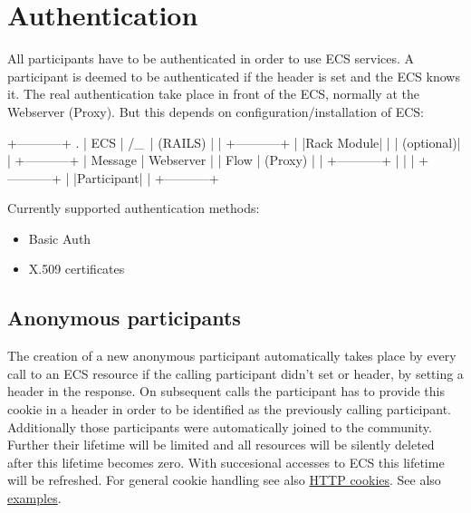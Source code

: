 \section{Authentication}%
%
All participants have to be authenticated in order to use ECS services. A
participant is deemed to be authenticated if the  header is set and
the ECS knows it. The real authentication take place in front of the ECS,
normally at the Webserver (Proxy). But this depends on
configuration/installation of ECS:
\begin{txtg}
   +-----------+    .        
   |   ECS     |   /_\       
   | (RAILS)   |    |        
   +-----------+    |        
   |Rack Module|    |        
   | (optional)|    |        
   +-----------+    | Message
   | Webserver |    | Flow   
   |  (Proxy)  |    |        
   +-----------+    |        
         |          |        
   +-----------+    |        
   |Participant|    |        
   +-----------+             
\end{txtg}
Currently supported authentication methods:
\begin{itemize}
  \item Basic Auth
  \item X.509 certificates
\end{itemize}

\hypertarget{anonymous-participants}{}
\subsection{Anonymous participants}%
%
The creation of a new anonymous participant automatically takes place by every
call to an ECS resource if the calling participant didn't set \hv{X-EcsAuthId}
or  header, by setting a \hv{Set-Cookie} header in the response. On
subsequent calls the participant has to provide this cookie in a \hv{Cookie}
header in order to be identified as the previously calling participant.
Additionally those participants were automatically joined to the 
community. Further their lifetime will be limited and all resources will be
silently deleted after this lifetime becomes zero. With succesional accesses to
ECS this lifetime will be refreshed. For general cookie handling see also
\href{http://en.wikipedia.org/wiki/HTTP\_cookie}{HTTP cookies}. See also
\href{https://ecs.uni-stuttgart.de/ecsa-wiki/HeikoBernloehr/FreeLancer/ECS/ecs2/core/examples}{examples}. 



